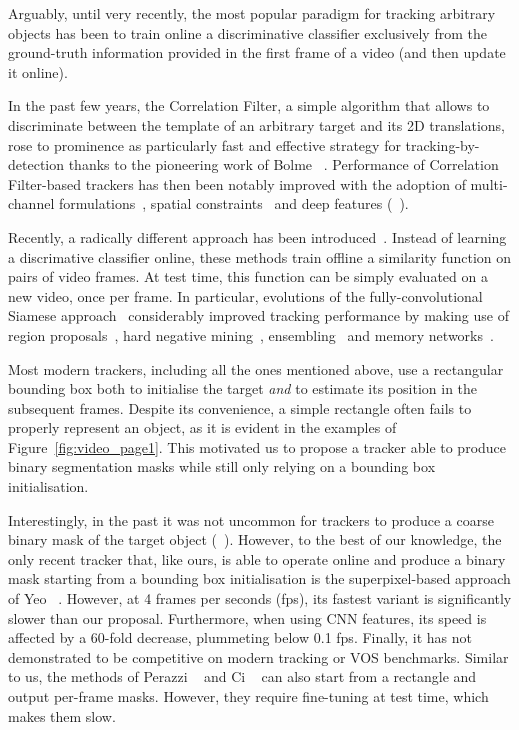 \documentclass[10pt,twocolumn,letterpaper]{article}
\newcommand{\mypar}[1]{\smallskip\noindent {\bf #1}\enskip}
\begin{document}
\mypar{Visual object tracking.}
Arguably, until very recently, the most popular paradigm for tracking arbitrary objects has been to train online a discriminative classifier exclusively from the ground-truth information provided in the first frame of a video (and then update it online).

In the past few years, the Correlation Filter, a simple algorithm that allows to discriminate between the template of an arbitrary target and its 2D translations, rose to prominence as particularly fast and effective strategy for tracking-by-detection thanks to the pioneering work of Bolme \etal~\cite{bolme2010visual}.
Performance of Correlation Filter-based trackers has then been notably improved with the adoption of multi-channel formulations~\cite{kiani2013multi,henriques2015tracking}, spatial constraints~\cite{kiani2015correlation,danelljan2015learning,lukezic2017discriminative,li2018learning} and deep features (\eg~\cite{danelljan2017eco,valmadre2017end}). 

Recently, a radically different approach has been introduced~\cite{bertinetto2016fully,held2016learning,tao2016siamese}. 
Instead of learning a discrimative classifier online, these methods train offline a similarity function on pairs of video frames.
At test time, this function can be simply evaluated on a new video, once per frame.
In particular, evolutions of the fully-convolutional Siamese approach~\cite{bertinetto2016fully} considerably improved tracking performance by making use of region proposals~\cite{SiamRPN}, hard negative mining~\cite{zhu2018distractor}, ensembling~\cite{he2018towards} and memory networks~\cite{yang2018learning}.

Most modern trackers, including all the ones mentioned above, use a rectangular bounding box both to initialise the target \emph{and} to estimate its position in the subsequent frames.
Despite its convenience, a simple rectangle often fails to properly represent an object, as it is evident in the examples of Figure~\ref{fig:video_page1}.
This motivated us to propose a tracker able to produce binary segmentation masks while still only relying on a bounding box initialisation.

Interestingly, in the past it was not uncommon for trackers to produce a coarse binary mask of the target object (\eg~\cite{comaniciu2000real,perez2002color}).
However, to the best of our knowledge, the only recent tracker that, like ours, is able to operate online and produce a binary mask starting from a bounding box initialisation is the superpixel-based approach of Yeo \etal~\cite{yeo2017superpixel}.
However, at 4 frames per seconds (fps), its fastest variant is significantly slower than our proposal.
Furthermore, when using CNN features, its speed is affected by a 60-fold decrease, plummeting below 0.1 fps.
Finally, it has not demonstrated to be competitive on modern tracking or VOS benchmarks.
Similar to us, the methods of Perazzi \etal~\cite{perazzi2017learning} and Ci \etal~\cite{ci2018video} can also start from a rectangle and output per-frame masks.
However, they require fine-tuning at test time, which makes them slow.
\end{document}
